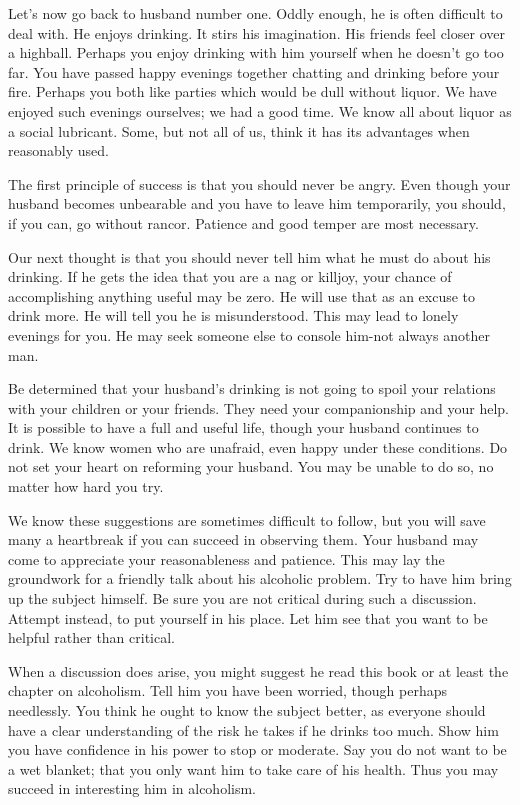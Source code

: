 \begin{biblechapter}
Let's now go back to husband number one.  Oddly enough, he is often difficult to deal with.  He enjoys drinking.  It stirs his imagination.  His friends feel closer over a highball.  Perhaps you enjoy drinking with him yourself when he doesn't go too far.  You have passed happy evenings together chatting and drinking before your fire.  Perhaps you both like parties which would be dull without liquor.  We have enjoyed such evenings ourselves; we had a good time.  We know all about liquor as a social lubricant.  Some, but not all of us, think it has its advantages when reasonably used.

The first principle of success is that you should never be angry.  Even though your husband becomes unbearable and you have to leave him temporarily, you should, if you can, go without rancor.  Patience and good temper are most necessary.

Our next thought is that you should never tell him what he must do about his drinking.  If he gets the idea that you are a nag or killjoy, your chance of accomplishing anything useful may be zero.  He will use that as an excuse to drink more.  He will tell you he is misunderstood.  This may lead to lonely evenings for you.  He may seek someone else to console him-not always another man.

Be determined that your husband's drinking is not going to spoil your relations with your children or your friends.  They need your companionship and your help.  It is possible to have a full and useful life, though your husband continues to drink.  We know women who are unafraid, even happy under these conditions.  Do not set your heart on reforming your husband.  You may be unable to do so, no matter how hard you try.

We know these suggestions are sometimes difficult to follow, but you will save many a heartbreak if you can succeed in observing them.  Your husband may come to appreciate your reasonableness and patience.  This may lay the groundwork for a friendly talk about his alcoholic problem.  Try to have him bring up the subject himself.  Be sure you are not critical during such a discussion.  Attempt instead, to put yourself in his place.  Let him see that you want to be helpful rather than critical.

When a discussion does arise, you might suggest he read this book or at least the chapter on alcoholism.  Tell him you have been worried, though perhaps needlessly.  You think he ought to know the subject better, as everyone should have a clear understanding of the risk he takes if he drinks too much.  Show him you have confidence in his power to stop or moderate.  Say you do not want to be a wet blanket; that you only want him to take care of his health.  Thus you may succeed in interesting him in alcoholism.


\end{biblechapter}
